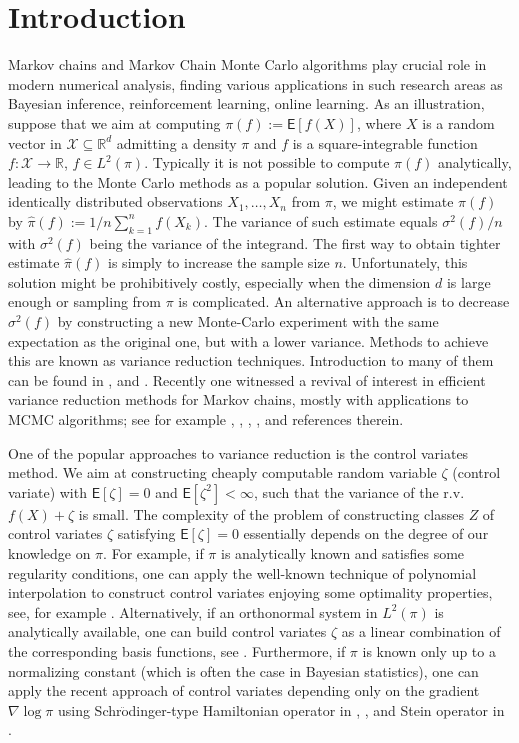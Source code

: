 \documentclass[bj]{imsart}
\def\PE{\mathsf{E}}
\def\rset{\mathbb{R}}
\def\rset{\mathbb{R}}
\begin{document}
\section{Introduction}
Markov chains and Markov Chain Monte Carlo algorithms play crucial role in modern numerical analysis, finding various applications in such research areas as Bayesian inference, reinforcement learning, online learning. As an illustration, suppose that we aim at computing $\pi(f):= \PE\left[f(X)\right]$, where $X$ is a random vector in $\mathcal{X} \subseteq \rset^d$ admitting a density $\pi$ and $f$ is a square-integrable function $f:\mathcal{X} \to \rset$, $f \in L^2(\pi)$. Typically it is not possible to compute $\pi(f)$ analytically, leading to the Monte Carlo methods as a popular solution. Given an independent identically distributed observations $X_1,\ldots,X_n$ from $\pi$, we might estimate $\pi(f)$ by $\hat{\pi}(f):=1/n\sum_{k=1}^{n}f(X_k)$. The variance of such estimate equals $\sigma^2(f)/n$  with $\sigma^2(f)$ being the variance of the integrand. The first way to obtain tighter estimate $\hat{\pi}(f)$ is simply to increase the sample size $n$. Unfortunately, this solution might be prohibitively costly, especially when the dimension $d$ is large enough or sampling from $\pi$ is complicated. An alternative approach is to decrease $\sigma^2(f)$ by constructing a new Monte-Carlo experiment with the same expectation as the original one, but with a lower variance. Methods to achieve this are known as variance
reduction techniques. Introduction to many of them can be found in \cite{rubinstein2016simulation}, \cite{GobetBook} and \cite{glasserman2013monte}. Recently one witnessed a revival of interest in efficient variance reduction methods  for Markov chains, mostly with applications to MCMC algorithms; see for example \cite{dellaportas2012control}, \cite{mira2013zero}, \cite{oates:girolami:chopin:2016}, \cite{south:mira:drovandi:2018}, \cite{brosse2018diffusion} and references therein.
\par
One of the popular approaches to variance reduction is the control variates method. We aim at constructing cheaply computable random variable $\zeta$ (control variate) with $\PE[\zeta] = 0$ and $\PE[\zeta^2] < \infty$, such that the variance of the r.v. $f(X) + \zeta$ is small. The complexity of the problem of constructing classes $Z$ of control variates \(\zeta\) satisfying   $\PE[\zeta]=0$ essentially depends on the degree of our knowledge on \(\pi.\)
For example, if \(\pi\) is analytically known and satisfies some regularity conditions, one can apply the well-known technique of  polynomial interpolation to construct control variates enjoying  some optimality properties, see, for example \cite[Section~3.2]{dimov2008monte}. Alternatively, if an orthonormal system in \(L^2(\pi)\) is analytically available, one can build control variates \(\zeta\) as a linear combination of the corresponding basis functions, see \cite{GobetCV}. Furthermore, if \(\pi\) is known only up to a normalizing constant (which is often the case in Bayesian statistics), one can apply the recent approach of control variates  depending only on the gradient \(\nabla \log \pi\)  using Schr\(\ddot{\text{o}}\)dinger-type Hamiltonian operator in  \cite{assaraf1999zero}, \cite{mira2013zero}, and Stein operator in \cite{brosse2018diffusion}.
\end{document}
